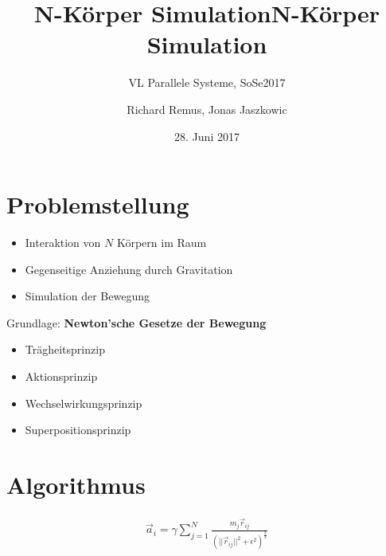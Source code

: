 \documentclass{beamer}
\begin{document}
\title{N-Körper Simulation}
\subtitle{VL Parallele Systeme, SoSe2017}
\author{Richard Remus, Jonas Jaszkowic}
\date{28. Juni 2017}

\begin{frame}
\title{N-Körper Simulation}
\titlepage
\end{frame}

\section{Problemstellung}
\begin{frame}
\begin{itemize}
  \item Interaktion von $N$ Körpern im Raum
  \item Gegenseitige Anziehung durch Gravitation
  \item Simulation der Bewegung
\end{itemize}
\end{frame}

\begin{frame}
Grundlage: \textbf{Newton'sche Gesetze der Bewegung}\vspace{1cm}
\begin{itemize}
  \item Trägheitsprinzip
  \item Aktionsprinzip
  \item Wechselwirkungsprinzip
  \item Superpositionsprinzip
\end{itemize}
\end{frame}


\section{Algorithmus}
\begin{frame}
\begin{center}
\begin{huge}
  \begin{align*}
    \vec{a}^{\,}_i = \gamma \sum\limits_{j=1}^N \frac{m_j  \vec{r}^{\,}_{ij}}{(|| \vec{r}^{\,}_{ij} ||^2 + \epsilon^2)^{\frac{3}{2}}}
  \end{align*}
\end{huge}
\end{center}
\end{frame}
\end{document}
